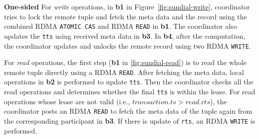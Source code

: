 {\bf One-sided}
For {\em write} operations,
in \step \textbf{b1} in Figure~\ref{fig:sundial-write},
coordinator tries to lock the remote tuple and fetch the meta data and the record using the combined RDMA \texttt{ATOMIC CAS} and RDMA \texttt{READ} in \step \textbf{b1}. The coordinator also updates the \texttt{tts} using received meta data in \step \textbf{b3}. In \step \textbf{b4}, after the computation, the coordinator updates and unlocks the remote record using two RDMA \texttt{WRITE}.

For {\em read} operations, the first step (\step \textbf{b1} in \ref{fig:sundial-read}) is to read the whole remote tuple directly using a RDMA \texttt{READ}. After fetching the meta data, local operations in \step \textbf{b2} is performed to update \texttt{tts}. 
Then the coordinator checks all the read operations and determines whether
the final \texttt{tts} is within the lease. For read operations whose lease are not valid (i.e., $transaction.ts > read.rts$), the coordinator posts an RDMA \texttt{READ} to fetch the meta data of the tuple again from the corresponding participant in \step \textbf{b3}. 
If there is update of \texttt{rts}, an RDMA \texttt{WRITE} 
is performed. 



\begin{comment}
\begin{figure}[h]
\begin{lstlisting}[caption=a5 in Figure~\ref{fig:sundial-read},captionpos=b,label={lst:sundial-rpc-renew}]
Function renew_lease_handler_twosided(key, wts, transaction_ts)
    if wts != DB[key].wts or (transaction_ts > DB[key].rts and DB[key].locked == TRUE):
        ret = ABORT
    else:
        DB[key].rts = Max(DB[key].rts, transaction_ts)
        ret = SUCCESS
\end{lstlisting}
\end{figure}

\begin{figure}[h]
\begin{lstlisting}[caption=b4 in Figure~\ref{fig:sundial-read},captionpos=b,label={lst:sundial-onesided-renew}]
Function renew_lease_onesided(offset, wts, transaction_ts)
    meta = RDMA_read(offset) // get meta data of remote tuple
    if wts != meta.wts or (transaction_ts > meta.rts and meta.locked == TRUE):
        ret = ABORT
    else:
        if meta.rts < transaction_ts:
            new_rts = transaction_ts
            RDMA_write(offset, new_rts) // renew the rts 
        ret = SUCCESS
            
\end{lstlisting}
\end{figure}
\end{comment}

